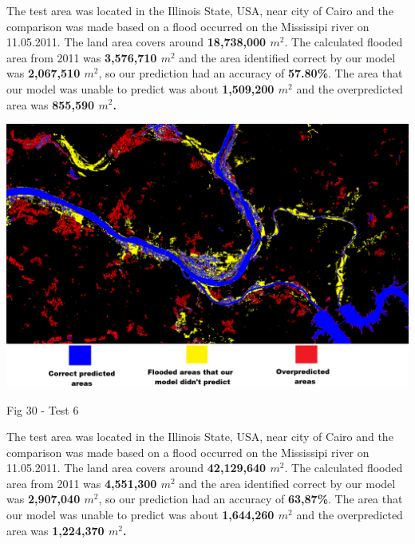 \documentclass[12pt, a4paper]{report}
\begin{document}
The test area was located in the Illinois State, USA, near city of Cairo and the comparison was made based on a flood occurred on the Mississipi river on 11.05.2011. The land area covers around \textbf{18,738,000 $m^2$}. The calculated flooded area from 2011 was \textbf{3,576,710 $m^2$} and the area identified correct by our model was \textbf{2,067,510 $m^2$}, so our prediction had an accuracy of \textbf{57.80\%}. The area that our model was unable to predict was about \textbf{1,509,200 $m^2$} and the overpredicted area was \textbf{855,590 $m^2$.}

\newpage

\bigskip
\includegraphics[scale=0.4, center]{test_6.png}
\begin{center}
Fig 30 - Test 6
\end{center}
\par 

The test area was located in the Illinois State, USA, near city of Cairo and the comparison was made based on a flood occurred on the Mississipi river on 11.05.2011. The land area covers around \textbf{42,129,640 $m^2$}. The calculated flooded area from 2011 was \textbf{4,551,300 $m^2$} and the area identified correct by our model was \textbf{2,907,040 $m^2$}, so our prediction had an accuracy of \textbf{63,87\%}. The area that our model was unable to predict was about \textbf{1,644,260 $m^2$} and the overpredicted area was \textbf{1,224,370 $m^2$.}

\newpage
\end{document}
